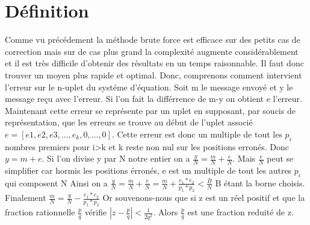 \documentclass[a4paper, 11pt]{report}
\begin{document}
\section{Définition}
Comme vu précédement la méthode brute force est efficace sur des petits cas de 
correction mais sur de cas plus grand la complexité augmente considérablement et il est très difficile d'obtenir des résultats en un temps raisonnable.\newline
Il faut donc trouver un moyen plus rapide et optimal. Donc, comprenons comment intervient l'erreur sur le n-uplet du systéme d'équation.\newline
Soit m le message envoyé et y le message reçu avec l'erreur. Si l'on fait la différrence de m-y on obtient e l'erreur.
Maintenant cette erreur se représente par un uplet en supposant, par soucis de représentation, que les erreurs se trouve au début de l'uplet associé
$e = [e1,e2,e3,...,e_k,0,...,0]$. Cette erreur est donc un multiple de tout les $p_i$ nombres premiers pour i>k et k  reste non nul sur les positions erronés.\newline
Donc $y = m + e$. Si l'on divise y par N notre entier on a $\frac{y}{N}=\frac{m}{N}+\frac{e}{N}$.\newline
Mais $\frac{e}{N}$ peut se simplifier car hormis les positions érronés, e est un multiple de tout les autres $p_i$ qui composent N\newline
Ainsi on a  $\frac{y}{N}=\frac{m}{N}+\frac{e}{N}=\frac{m}{N}+ \frac{e_1 * e_2}{p_1 * p_2 } <\frac{B}{N} $ B étant la borne choisis.\newline
Finalement $\frac{m}{N}=\frac{y}{N} - \frac{e_1 * e_2}{p_1 * p_2 } $ \newline
\newline
Or souvenons-nous que si z est un réel positif et que la fraction rationnelle $\frac{p}{q}$
vérifie $ \left| z - \frac{p}{q} \right| < \frac{1}{2q^2} $. 
Alors $\frac{p}{q}$ est une fraction reduité de z.\newline
\newline
\end{document}
